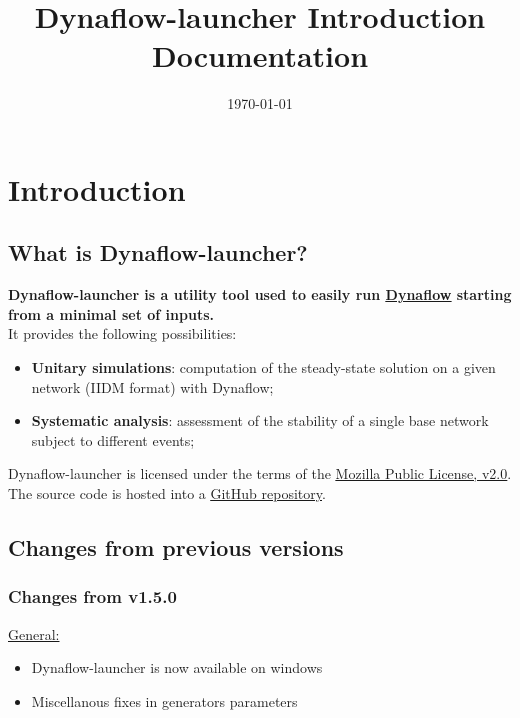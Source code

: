 \documentclass[a4paper, 12pt]{report}
\begin{document}
\title{Dynaflow-launcher Introduction Documentation}
\date\today

\maketitle
\tableofcontents

\chapter{Introduction}

\section{What is Dynaflow-launcher?}

\textbf{Dynaflow-launcher is a utility tool used to easily run \href{https://dynawo.github.io/about/dynaflow}{\underline{Dynaflow}}
starting from a minimal set of inputs.} \\

It provides the following possibilities:
\begin{itemize}
  \item \textbf{Unitary simulations}: computation of the steady-state solution on a given network (IIDM format) with Dynaflow;
  \item \textbf{Systematic analysis}: assessment of the stability of a single base network subject to different events;
\end{itemize}

Dynaflow-launcher is licensed under the terms of the \href{http://mozilla.org/MPL/2.0}{\underline{Mozilla Public License, v2.0}}.
The source code is hosted into a \href{https://github.com/dynawo/dynaflow-launcher} {\underline{GitHub repository}}. \\

\section{Changes from previous versions}

\subsection{Changes from v1.5.0}

\underline{General:}

\begin{itemize}
\item Dynaflow-launcher is now available on windows
\item Miscellanous fixes in generators parameters
\end{itemize}
\end{document}
